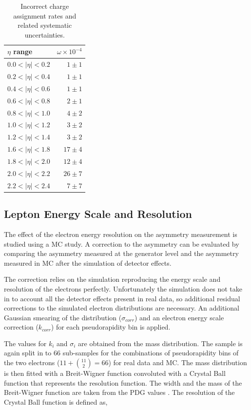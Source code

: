\begin{table}[htbp]
  \begin{center}
\begin{tabular}{lr}
\toprule
$\eta$ range        & $\omega \times 10^{-4}$    \\
\midrule
$0.0<| \eta |<0.2$  & $ 1 \pm 1 $    \\ 
$0.2<| \eta |<0.4$  & $ 1 \pm 1 $    \\
$0.4<| \eta |<0.6$  & $ 1 \pm 1 $    \\
$0.6<| \eta |<0.8$  & $ 2 \pm 1 $    \\
$0.8<| \eta |<1.0$  & $ 4 \pm 2 $    \\ 
$1.0<| \eta |<1.2$  & $ 3 \pm 2 $    \\
$1.2<| \eta |<1.4$  & $ 3 \pm 2 $    \\
$1.6<| \eta |<1.8$  & $17 \pm 4 $    \\
$1.8<| \eta |<2.0$  & $12 \pm 4 $    \\
$2.0<| \eta |<2.2$  & $26 \pm 7 $    \\
$2.2<| \eta |<2.4$  & $ 7 \pm 7 $    \\
\bottomrule
\end{tabular}
\caption{\label{tab:mischarge}Incorrect charge assignment rates and related
systematic uncertainties.}
\end{center}
\end{table}

\subsection{Lepton Energy Scale and Resolution}
The effect of the electron energy resolution on the asymmetry measurement is
studied using a {MC} study. A correction to the asymmetry can be evaluated by
comparing the asymmetry measured at the generator level and the asymmetry
measured in {MC} after the simulation of detector effects.

The correction relies on the simulation reproducing the energy scale and
resolution of the electrons perfectly. Unfortunately the simulation does not
take in to account all the detector effects present in real data, so additional
residual corrections to the simulated electron \pT distributions are necessary.
An additional Gaussian smearing of the \pT distribution ($\sigma_{corr}$) and an
electron energy scale correction ($k_{corr}$) for each pseudorapidity bin is
applied.

The values for $k_{i}$ and $\sigma_{i}$ are obtained from the
\HepProcess{\PZ\to\Pe\Pe} mass distribution. The \HepProcess{\PZ\to\Pe\Pe}
sample is again split in to 66 sub-samples for the combinations of
pseudorapidity bins of the two electrons ($11+\binom{11}{2} = 66$) for real data
and {MC}.  The \HepProcess{\PZ\to\Pe\Pe} mass distribution is then fitted
with a Breit-Wigner function convoluted with a Crystal Ball function that
represents the resolution function. The width and the mass of the Breit-Wigner
function are taken from the PDG values \cite{}. The resolution of the Crystal
Ball function is defined as,

